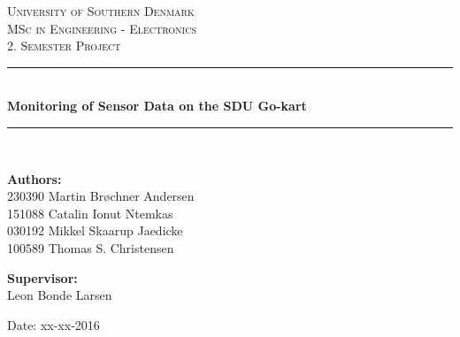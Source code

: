 \begin{titlepage}
\begin{center}

\textsc{\LARGE University of Southern Denmark}\\[1.5cm]
\textsc{\Large MSc in Engineering - Electronics}\\
\textsc{\large 2. Semester Project}\\[0.5cm]

\vfill
\vspace{3cm}
\hrule ~\\[0.3cm]
{ \LARGE \bfseries Monitoring of Sensor Data on the SDU Go-kart\\[0.4cm] }
\hrule ~\\[1.5cm]

\vfill

\vspace{7cm}
\begin{minipage}[t]{.49\textwidth}
\begin{flushleft} \large
\textbf{Authors:}\\
230390 Martin Brøchner Andersen\\
151088 Catalin Ionut Ntemkas\\
030192 Mikkel Skaarup Jaedicke\\
100589 Thomas S. Christensen
\end{flushleft}
\end{minipage}
\begin{minipage}[t]{.49\textwidth}
\begin{flushright} \large
\textbf{Supervisor:} \\
Leon Bonde Larsen
\end{flushright}
\end{minipage}

\vspace{1cm}
Date: xx-xx-2016

\vspace{1cm}

\end{center}
\end{titlepage}